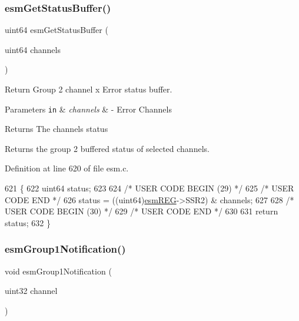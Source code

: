 \subsubsection{\texorpdfstring{esm\+Get\+Status\+Buffer()}{esmGetStatusBuffer()}}
{\footnotesize\ttfamily uint64 esm\+Get\+Status\+Buffer (\begin{DoxyParamCaption}\item[{uint64}]{channels }\end{DoxyParamCaption})}



Return Group 2 channel x Error status buffer. 


\begin{DoxyParams}[1]{Parameters}
\mbox{\tt in}  & {\em channels} & -\/ Error Channels\\
\hline
\end{DoxyParams}
\begin{DoxyReturn}{Returns}
The channels status
\end{DoxyReturn}
Returns the group 2 buffered status of selected channels. 

Definition at line 620 of file esm.\+c.


\begin{DoxyCode}
621 \{
622     uint64 status;
623 
624 \textcolor{comment}{/* USER CODE BEGIN (29) */}
625 \textcolor{comment}{/* USER CODE END */}
626     status = ((uint64)\mbox{\hyperlink{reg__esm_8h_a7c2e779f2973e0c2c9496a4796df10f1}{esmREG}}->SSR2) & channels;
627 
628 \textcolor{comment}{/* USER CODE BEGIN (30) */}
629 \textcolor{comment}{/* USER CODE END */}
630 
631     \textcolor{keywordflow}{return} status;
632 \}
\end{DoxyCode}
\mbox{\label{group__ESM_ga47f1650e27c094120e414ad3332ea311}} 
\subsubsection{\texorpdfstring{esm\+Group1\+Notification()}{esmGroup1Notification()}}
{\footnotesize\ttfamily void esm\+Group1\+Notification (\begin{DoxyParamCaption}\item[{uint32}]{channel }\end{DoxyParamCaption})}



